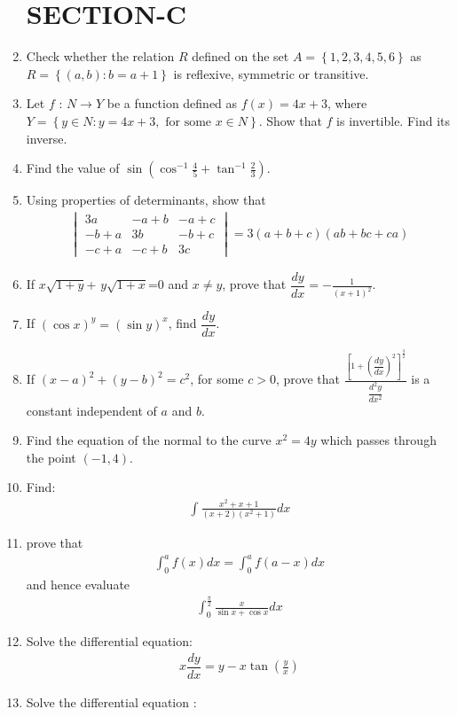 \documentclass[12pt,letterpaper]{article}
\newcommand{\brak}[1]{\left( #1 \right)}
\newcommand{\mydit}[9]{\begin{vmatrix} #1 & #2 & #3 \\ #4 & #5 & #6 \\ #7 & #8 & #9 \end{vmatrix}}
\newcommand{\cbrak}[1]{\left\{#1\right\}}
\newcommand{\sbrak}[1]{\left[#1\right]}
\begin{document}
\begin{enumerate}
\section*{SECTION-C}
\item Check whether the relation $R$ defined on the set $A=\cbrak{1,2,3,4,5,6}$ as $R =\cbrak {(a, b) : b = a + 1}$ is reflexive, symmetric or transitive.
\item Let $f$ : $N\rightarrow Y $ be a function defined as $f\brak{x}= 4x + 3$, where $Y=\cbrak{y\in N:y=4x+3, \text{ for some } x\in N}$. Show that $f$ is invertible. Find its inverse.
\item Find the value of $\sin\brak{\cos^{-1}{\frac{4}{5}}+{\tan^{-1}{\frac{2}{3}}}}$.
\item Using properties of determinants, show that 
\begin{align*} 
\mydit{3a}{-a+b}{-a+c}{-b+a}{3b}{-b+c}{-c+a}{-c+b}{3c} = 3\brak{a+b+c}\brak{ab+bc+ca}
\end{align*}
\item If $x\sqrt{1+y}$+ $y\sqrt{1+x}$=0 and $x\neq y$, prove that $\dfrac{dy}{dx} = -\frac{1}{\brak{x+1}^2}$.
\item If $\brak{\cos x}^y = \brak{\sin y }^x$, find $\dfrac{dy}{dx}$.
\item If $\brak{x-a}^2+\brak{y-b}^2={c}^2$, for some $c>0$, prove that
$\frac{\sbrak{1+\brak{\dfrac{dy}{dx}}^2}^\frac{3}{2}}{\dfrac{d^2y}{dx^2}}$ is a constant independent of $a$ and $b$.
\item Find the equation of the normal to the curve ${x}^2 = 4y$ which passes through the point $\brak{-1,4}$.
\item Find: \begin{align*}\int{\frac{x^2+x+1}{\brak{x+2}\brak{x^2+1}}}dx\end{align*}
\item prove that 
\begin{align*}
    \int_{0}^{a} f\brak{x}dx = \int_{0}^{a} f\brak{a-x}dx
\end{align*}
and hence evaluate 
\begin{align*}
\int_{0}^{\frac{\pi}{2}}\frac{x}{{\sin x}+{\cos x}}dx
\end{align*}
\item Solve the differential equation: 
\begin{align*}
{x}\dfrac{dy}{dx}= {y}-{x}\tan\brak{\frac{y}{x}}
\end{align*}
\item Solve the differential equation : 
\begin{align*}

\end{align*}
\end{enumerate}
\end{document}
